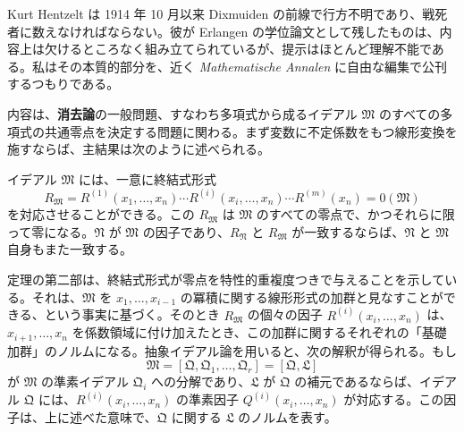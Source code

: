 \documentclass[11pt]{article}
\begin{document}
Kurt Hentzelt は 1914 年 10 月以来 Dixmuiden の前線で行方不明であり、戦死者に数えなければならない。彼が Erlangen の学位論文として残したものは、内容上は欠けるところなく組み立てられているが、提示はほとんど理解不能である。私はその本質的部分を、近く \emph{Mathematische Annalen} に自由な編集で公刊するつもりである。

内容は、\textbf{消去論}の一般問題、すなわち多項式から成るイデアル $\mathfrak M$ のすべての多項式の共通零点を決定する問題に関わる。まず変数に不定係数をもつ線形変換を施すならば、主結果は次のように述べられる。

イデアル $\mathfrak M$ には、一意に終結式形式
\[
 R_{\mathfrak M}=R^{(1)}(x_1,
\ldots,x_n)\cdots R^{(i)}(x_i,
\ldots,x_n)\cdots R^{(m)}(x_n)=0(\mathfrak M)
\]
を対応させることができる。この $R_{\mathfrak M}$ は $\mathfrak M$ のすべての零点で、かつそれらに限って零になる。$\mathfrak N$ が $\mathfrak M$ の因子であり、$R_{\mathfrak N}$ と $R_{\mathfrak M}$ が一致するならば、$\mathfrak N$ と $\mathfrak M$ 自身もまた一致する。

定理の第二部は、終結式形式が零点を特性的重複度つきで与えることを示している。それは、$\mathfrak M$ を $x_1,\ldots,x_{i-1}$ の冪積に関する線形形式の加群と見なすことができる、という事実に基づく。そのとき $R_{\mathfrak M}$ の個々の因子 $R^{(i)}(x_i,\ldots,x_n)$ は、$x_{i+1},\ldots,x_n$ を係数領域に付け加えたとき、この加群に関するそれぞれの「基礎加群」のノルムになる。抽象イデアル論を用いると、次の解釈が得られる。もし
\[
 \mathfrak M=[\mathfrak Q,\mathfrak Q_1,
\ldots,
\mathfrak Q_r]=[\mathfrak Q,\mathfrak L]
\]
が $\mathfrak M$ の準素イデアル $\mathfrak Q_i$ への分解であり、$\mathfrak L$ が $\mathfrak Q$ の補元であるならば、イデアル $\mathfrak Q$ には、$R^{(i)}(x_i,\ldots,x_n)$ の準素因子 $Q^{(i)}(x_i,\ldots,x_n)$ が対応する。この因子は、上に述べた意味で、$\mathfrak Q$ に関する $\mathfrak L$ のノルムを表す。
\end{document}
